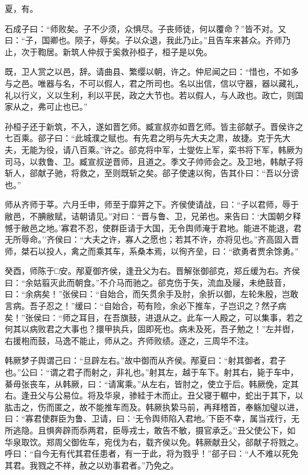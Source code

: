 \documentclass[]{article}
\begin{document}
夏，有。

石成子曰：``师败矣。子不少须，众惧尽。子丧师徒，何以覆命？''皆不对。又曰：``子，国卿也。陨子，辱矣。子以众退，我此乃止。''且告车来甚众。齐师乃止，次于鞫居。新筑人仲叔于奚救孙桓子，桓子是以免。

既，卫人赏之以邑，辞。请曲县、繁缨以朝，许之。仲尼闻之曰：``惜也，不如多与之邑。唯器与名，不可以假人，君之所司也。名以出信，信以守器，器以藏礼，礼以行义，义以生利，利以平民，政之大节也。若以假人，与人政也。政亡，则国家从之，弗可止也已。''

孙桓子还于新筑，不入，遂如晋乞师。臧宣叔亦如晋乞师。皆主郤献子。晋侯许之七百乘。郤子曰：``此城濮之赋也。有先君之明与先大夫之肃，故捷。克于先大夫，无能为役，请八百乘。''许之。郤克将中军，士燮佐上军，栾书将下军，韩厥为司马，以救鲁、卫。臧宣叔逆晋师，且道之。季文子帅师会之。及卫地，韩献子将斩人，郤献子驰，将救之，至则既斩之矣。郤子使速以徇，告其仆曰：``吾以分谤也。''

师从齐师于莘。六月壬申，师至于靡笄之下。齐侯使请战，曰：``子以君师，辱于敝邑，不腆敝赋，诘朝请见。''对曰：``晋与鲁、卫，兄弟也。来告曰：`大国朝夕释憾于敝邑之地。'寡君不忍，使群臣请于大国，无令舆师淹于君地。能进不能退，君无所辱命。''齐侯曰：``大夫之许，寡人之愿也；若其不许，亦将见也。''齐高固入晋师，桀石以投人，禽之而乘其车，系桑本焉，以徇齐垒，曰：``欲勇者贾余馀勇。''

癸酉，师陈于□安。邴夏御齐侯，逢丑父为右。晋解张御郤克，郑丘缓为右。齐侯曰：``余姑翦灭此而朝食。''不介马而驰之。郤克伤于矢，流血及屦，未绝鼓音，曰：``余病矣！''张侯曰：``自始合，而矢贯余手及肘，余折以御，左轮朱殷，岂敢言病。吾子忍之！''缓曰：``自始合，苟有险，余必下推车，子岂识之？然子病矣！''张侯曰：``师之耳目，在吾旗鼓，进退从之。此车一人殿之，可以集事，若之何其以病败君之大事也？擐甲执兵，固即死也。病未及死，吾子勉之！''左并辔，右援枹而鼓，马逸不能止，师从之。齐师败绩。逐之，三周华不注。

韩厥梦子舆谓己曰：``旦辟左右。''故中御而从齐侯。邴夏曰：``射其御者，君子也。''公曰：``谓之君子而射之，非礼也。''射其左，越于车下。射其右，毙于车中，綦毋张丧车，从韩厥，曰：``请寓乘。''从左右，皆肘之，使立于后。韩厥俛，定其右。逢丑父与公易位。将及华泉，骖絓于木而止。丑父寝于轏中，蛇出于其下，以肱击之，伤而匿之，故不能推车而及。韩厥执絷马前，再拜稽首，奉觞加璧以进，曰：``寡君使群臣为鲁、卫请，曰：`无令舆师陷入君地。'下臣不幸，属当戎行，无所逃隐。且惧奔辟而忝两君，臣辱戎士，敢告不敏，摄官承乏。''丑父使公下，如华泉取饮。郑周父御佐车，宛伐为右，载齐侯以免。韩厥献丑父，郤献子将戮之。呼曰：``自今无有代其君任患者，有一于此，将为戮乎！''郤子曰：``人不难以死免其君。我戮之不祥，赦之以劝事君者。''乃免之。
\end{document}
